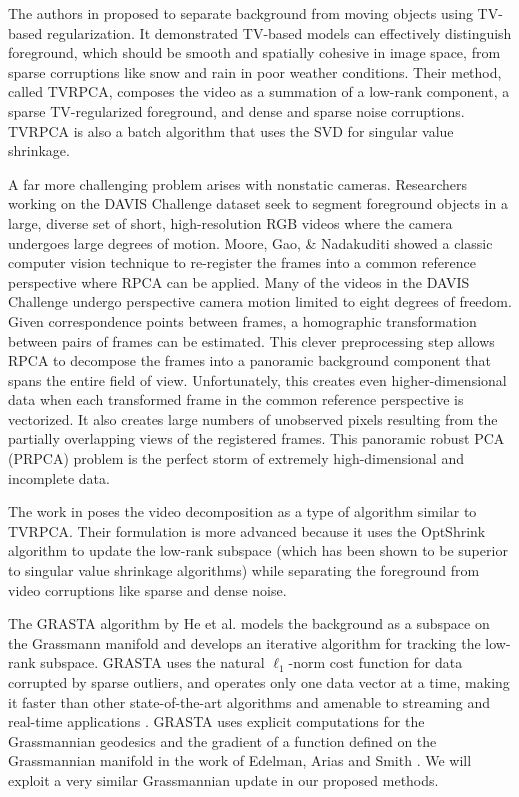 \documentclass[10pt,twocolumn,letterpaper]{article}
\begin{document}
The authors in \cite{tv_rpca} proposed to separate background from moving objects using TV-based regularization. It demonstrated TV-based models can effectively distinguish foreground, which should be smooth and spatially cohesive in image space, from sparse corruptions like snow and rain in poor weather conditions. Their method, called TVRPCA, composes the video as a summation of a low-rank component, a sparse TV-regularized foreground, and dense and sparse noise corruptions. TVRPCA is also a batch algorithm that uses the SVD for singular value shrinkage.

A far more challenging problem arises with nonstatic cameras. Researchers working on the DAVIS Challenge \cite{DAVIS} dataset seek to segment foreground objects in a large, diverse set of short, high-resolution RGB videos where the camera undergoes large degrees of motion. Moore, Gao, \& Nadakuditi \cite{B.Moore} showed a classic computer vision technique to re-register the frames into a common reference perspective where RPCA can be applied. Many of the videos in the DAVIS Challenge undergo perspective camera motion limited to eight degrees of freedom. Given correspondence points between frames, a homographic transformation between pairs of frames can be estimated. This clever preprocessing step allows RPCA to decompose the frames into a panoramic background component that spans the entire field of view. Unfortunately, this creates even higher-dimensional data when each transformed frame in the common reference perspective is vectorized. It also creates large numbers of unobserved pixels resulting from the partially overlapping views of the registered frames. This panoramic robust PCA (PRPCA) problem is the perfect storm of extremely high-dimensional and incomplete data.

The work in \cite{B.Moore} poses the video decomposition as a type of algorithm similar to TVRPCA. Their formulation is more advanced because it uses the OptShrink algorithm \cite{optshrink, Moore_Nadakuditi_Fessler} to update the low-rank subspace (which has been shown to be superior to singular value shrinkage algorithms) while separating the foreground from video corruptions like sparse and dense noise.

The GRASTA algorithm by He et al. \cite{grasta} models the background as a subspace on the Grassmann manifold and develops an iterative algorithm for tracking the low-rank subspace. GRASTA uses the natural $\ell_1$-norm cost function for data corrupted by sparse outliers, and operates only one data vector at a time, making it faster than other state-of-the-art algorithms and amenable to streaming and real-time applications \cite{grasta}. GRASTA uses explicit computations for the Grassmannian geodesics and the gradient of a function defined on the Grassmannian manifold in the work of Edelman, Arias and Smith \cite{edelman}. We will exploit a very similar Grassmannian update in our proposed methods.
\end{document}
